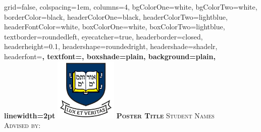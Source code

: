 \documentclass[landscape,final,a0paper,fontscale=0.26]{baposter}
\begin{document}
\begin{poster}%
  {
  grid=false,
  colspacing=1em,
  columns=4,
  bgColorOne=white,
  bgColorTwo=white,
  borderColor=black,
  headerColorOne=black,
  headerColorTwo=lightblue,
  headerFontColor=white,
  boxColorOne=white,
  boxColorTwo=lightblue,
  textborder=roundedleft,
  eyecatcher=true,
  headerborder=closed,
  headerheight=0.1\textheight,
  headershape=roundedright,
  headershade=shadelr,
  headerfont=\Large\bf\textsc, %
  textfont={\setlength{\parindent}{1.5em}},
  boxshade=plain,
  background=plain,
  linewidth=2pt
  }
    {\includegraphics[height=8em]{images/Yale}} 
  {\bf\textsc{Poster Title}\vspace{0.5em}}
  {\textsc{ Student Names\\ Advised by:}}
  {%

\setlength{\fboxsep}{0pt}%
\setlength{\fboxrule}{3pt}%
  }

    \newcommand{\colouredcircle}{%
      \tikz{\useasboundingbox (-0.2em,-0.32em) rectangle(0.2em,0.32em); \draw[draw=black,fill=lightblue,line width=0.03em] (0,0) circle(0.18em);}}


\end{poster}
\end{document}
